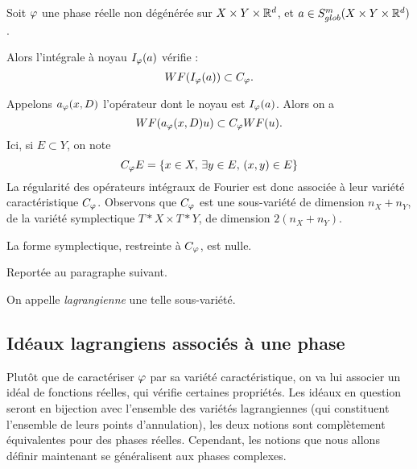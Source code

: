 \begin{prop}
  Soit $\varphi$ une phase réelle non dégénérée sur $X\times Y\times \mathbb{R}^d$, et $a \in S^m_{glob}(X\times Y\times \mathbb{R}^d)$. 

  Alors l'intégrale à noyau $I_{\varphi}(a)$ vérifie :
  \begin{equation*}
    WF(I_{\varphi}(a)) \subset C_{\varphi}.
  \end{equation*}
\end{prop}
Appelons $a_{\varphi}(x,D)$ l'opérateur dont le noyau est $I_{\varphi}(a)$. Alors on a 
  \begin{equation*}
    WF(a_{\varphi}(x,D)u) \subset C_{\varphi}WF(u).
  \end{equation*}
Ici, si $E \subset Y$, on note
\begin{equation*}
  C_{\varphi}E=\{x \in X,\,\exists y \in E,\,(x,y)\in E\}
\end{equation*}
La régularité des opérateurs intégraux de Fourier est donc associée à leur variété caractéristique $C_{\varphi}$. Observons que $C_{\varphi}$ est une sous-variété de dimension $n_X+n_Y$, de la variété symplectique $T*X\times T*Y$, de dimension $2(n_X+n_Y)$. 
\begin{lem}
La forme symplectique, restreinte à $C_{\varphi}$, est nulle.
\end{lem}
\begin{preuve}
Reportée au paragraphe suivant.
\end{preuve}
On appelle \emph{lagrangienne} une telle sous-variété.
\subsection{Idéaux lagrangiens associés à une phase}
Plutôt que de caractériser $\varphi$ par sa variété caractéristique, on va lui associer un idéal de fonctions réelles, qui vérifie certaines propriétés. Les idéaux en question seront en bijection avec l'ensemble des variétés lagrangiennes (qui constituent l'ensemble de leurs points d'annulation), les deux notions sont complètement équivalentes pour des phases réelles. Cependant, les notions que nous allons définir maintenant se généralisent aux phases complexes.

